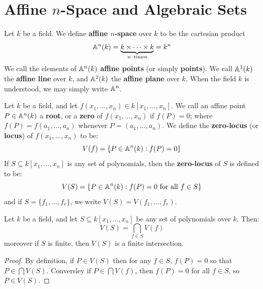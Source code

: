 \section{Affine $n$-Space and Algebraic Sets}\label{section_1.2}

\begin{definition}
  Let $k$ be a field. We define \textbf{affine $n$-space} over $k$ to
  be the cartesian product
  \begin{equation*}
    \mathbb{A}^n(k)=\underbrace{k \times \dots \times k}_{n\text{--times}}
    = k^n
  \end{equation*}
  We call the elements of $\mathbb{A}^n(k)$ \textbf{affine points} (or simply
  \textbf{points}). We call $\mathbb{A}^1(k)$ the \textbf{affine line} over
  $k$, and $\mathbb{A}^2(k)$ the \textbf{affine plane} over $k$. When the
  field $k$ is understood, we may simply write $\mathbb{A}^n$.
\end{definition}

\begin{definition}
  Let $k$ be a field, and let $f(x_1, \dots, x_n) \in k[x_1, \dots,
  x_n]$. We call an affine point $P \in \mathbb{A}^n(k)$ a \textbf{root}, or a
  \textbf{zero} of $f(x_1, \dots, x_n)$ if $f(P)=0$; where
  $f(P)=f(a_1, \dots, a_n)$ whenever $P=(a_1, \dots, a_n)$. We define
  the \textbf{zero-locus} (or \textbf{locus}) of $f(x_1, \dots, x_n)$
  to be:
  \begin{equation*}
    V(f)=\{P \in \mathbb{A}^n(k) : f(P)=0\}
  \end{equation*}
  If $S \subseteq k[x_1, \dots, x_n]$ is any set of polynomials, then
  the \textbf{zero-locus} of $S$ is defined to be:
  \begin{equation*}
    V(S)=\{ P \in \mathbb{A}^n(k) : f(P)=0 \text{ for all } f \in S \}
  \end{equation*}
  and if $S=\{f_1, \dots, f_r\}$, we write $V(S)=V(f_1, \dots, f_r)$.
\end{definition}

\begin{proposition}\label{proposition_10.1.1}
  Let $k$ be a field, and let $S \subseteq k[x_1, \dots, x_n]$ be any
  set of polynomials over $k$. Then:
  \begin{equation*}
    V(S)=\bigcap_{f \in S}{V(f)}
  \end{equation*}
  moreover if $S$ is finite, then $V(S)$ is a finite intersection.
\end{proposition}
\begin{proof}
  By definition, if $P \in V(S)$ then for any $f \in S$, $f(P)=0$ so
  that $P \in \bigcap{V(S)}$. Conversley if $P \in \bigcap{V(f)}$,
  then $f(P)=0$ for all $f \in S$, so $P \in V(S)$.
\end{proof}

